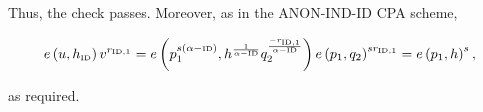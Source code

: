 \documentclass[11pt]{article}
\begin{document}
Thus, the check passes. Moreover, as in the ANON-IND-ID CPA scheme,

\begin{equation*}
 e \left( u, h_{\textrm{\tiny{ID}}} \right) v^{r_{ \textrm{\tiny{ID}},1}} = e \left( p_1^{s\left( \alpha - \textrm{\tiny{ID}} \right)}, h^{\frac{1}{\alpha - \textrm{\tiny{ID}}}} q_2^{\frac{- r_{\textrm{\tiny{ID}},1}}{\alpha - \textrm{\tiny{ID}}}} \right) e \left( p_1, q_2 \right)^{s r_{\textrm{\tiny{ID}},1}} = e \left( p_1, h\right)^s,
\end{equation*}

as required.
\end{document}
